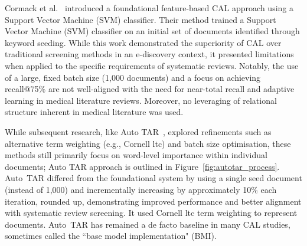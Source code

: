 \documentclass[10pt,oneside]{book}
\begin{document}
Cormack et al.~\cite{cormack_evaluation_2014} introduced a foundational feature-based CAL approach using a Support Vector Machine (SVM) classifier. Their method trained a Support Vector Machine (SVM) classifier on an initial set of documents identified through keyword seeding. While this work demonstrated the superiority of CAL over traditional screening methods in an e-discovery context, it presented limitations when applied to the specific requirements of systematic reviews. Notably, the use of a large, fixed batch size (1,000 documents) and a focus on achieving recall@75\% are not well-aligned with the need for near-total recall and adaptive learning in medical literature reviews. Moreover, no leveraging of relational structure inherent in medical literature was used.

While subsequent research, like Auto TAR~\cite{cormack_autonomy_2015}, explored refinements such as alternative term weighting (e.g., Cornell ltc) and batch size optimisation, these methods still primarily focus on word-level importance within individual documents; Auto TAR approach is outlined in Figure~\ref{fig:autotar_process}. Auto~TAR differed from the foundational system by using a single seed document (instead of 1,000) and incrementally increasing by approximately 10\% each iteration, rounded up, demonstrating improved performance and better alignment with systematic review screening. It used Cornell ltc term weighting \cite{salton_smart_1965} to represent documents. Auto~TAR has remained a de facto baseline in many CAL studies, sometimes called the ``base model implementation" (BMI).
\end{document}
